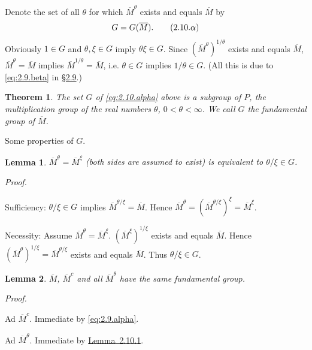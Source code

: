 \documentclass[b5paper,twoside]{article}
\newcommand{\secref}[2]{\hyperref[#1]{\mbox{\S#2}}}
\newcommand{\lemref}[2]{\hyperref[#1]{\mbox{Lemma~#2}}}
\theoremstyle{mvnplain}
\newtheorem{theorem}{Theorem}
\newtheorem{lemma}{Lemma}[section]
\renewenvironment{proof}[1][Proof]{%
  \par\addvspace{0.35\baselineskip}%
  \noindent\textit{#1.}\ \normalfont\ignorespaces
}{%
  \par\addvspace{0.35\baselineskip}%
}
\newcommand{\M}{\mathbf M}
\def\M{M}%
\def\mathfrak#1{#1}%
\begin{document}
Denote the set of all $\theta$ for which $\overline{\M}^{\theta}$ exists and
equals $\overline{\M}$ by
\begin{equation}
  \mathfrak G=\mathfrak G(\overline{\M}).
  \tag{2.10.\ensuremath{\alpha}}\label{eq:2.10.alpha}
\end{equation}
Obviously $1\in\mathfrak G$ and $\theta,\xi\in\mathfrak G$ imply
$\theta\xi\in\mathfrak G$.  Since
$(\overline{\M}^{\theta})^{1/\theta}$ exists and equals $\overline{\M}$,
$\overline{\M}^{\theta}=\overline{\M}$ implies
$\overline{\M}^{1/\theta}=\overline{\M}$, i.e.
$\theta\in\mathfrak G$ implies $1/\theta\in\mathfrak G$.  (All this is due
to \eqref{eq:2.9.beta} in \secref{sec:2.9}{2.9}.)

\begin{theorem}\label{thm:VIII}
The set $\mathfrak G$ of \eqref{eq:2.10.alpha} above is a subgroup of $P$,
the multiplication group of the real numbers $\theta$,
$0<\theta<\infty$.  We call $\mathfrak G$ the fundamental group of
$\overline{\M}$.
\end{theorem}

Some properties of $\mathfrak G$.
\begin{lemma}\label{lem:2.10.1}
$\overline{\M}^{\theta}=\overline{\M}^{\xi}$ (both sides are assumed to
exist) is equivalent to $\theta/\xi\in\mathfrak G$.
\end{lemma}
\begin{proof}
Sufficiency: $\theta/\xi\in\mathfrak G$ implies
$\overline{\M}^{\theta/\xi}=\overline{\M}$.  Hence
$\overline{\M}^{\theta}=(\overline{\M}^{\theta/\xi})^{\xi}
=\overline{\M}^{\xi}$.

Necessity: Assume $\overline{\M}^{\theta}=\overline{\M}^{\xi}$.
$(\overline{\M}^{\xi})^{1/\xi}$ exists and equals $\overline{\M}$.  Hence
$(\overline{\M}^{\theta})^{1/\xi}=\overline{\M}^{\theta/\xi}$ exists and
equals $\overline{\M}$.  Thus $\theta/\xi\in\mathfrak G$.
\end{proof}

\begin{lemma}\label{lem:2.10.2}
$\overline{\M}$, $\overline{\M}^{c}$ and all
$\overline{\M}^{\theta}$ have the same fundamental group.
\end{lemma}
\begin{proof}
Ad $\overline{\M}^{c}$.  Immediate by \eqref{eq:2.9.alpha}.

Ad $\overline{\M}^{\theta}$.  Immediate by
\lemref{lem:2.10.1}{2.10.1}.
\end{proof}
\end{document}
